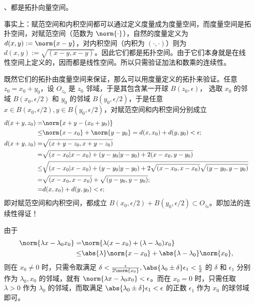 \begin{example}{}
、都是拓扑向量空间。

事实上：赋范空间和内积空间都可以通过定义度量成为度量空间，而度量空间是拓扑空间，对赋范空间（范数为 $\norm{\cdot}$），自然的度量定义为 $d(x,y):=\norm{x-y}$，对内积空间（内积为 $(\cdot,\cdot)$）则为 $d(x,y):=\sqrt{(x-y,x-y)}$。因此它们都是拓扑空间。由于它们本身就是在线性空间上定义的，因而都是线性空间。所以只需验证加法和数乘的连续性。

既然它们的拓扑由度量空间来保证，那么可以用度量定义的拓扑来验证。任意 $z_0=x_0+y_0$，设 $O_{z_0}$ 是 $z_0$ 邻域，于是其包含某一开球  $B(z_0,\epsilon)$， 选取 $x_0$ 的邻域 $B(x_0,\epsilon/2)$ 和 $y_0$ 的邻域 $B(y_0,\epsilon/2)$，于是任意 $x\in B(x_0,\epsilon/2),y\in B(y_0,\epsilon/2)$，对赋范空间和内积空间分别成立 
\begin{equation}
\begin{aligned}
d(x+y,z_0)=&\norm{x+y-(x_0+y_0)}\\
\leq& \norm{x-x_0}+\norm{y-y_0}=d(x,x_0)+d(y,y_0)< \epsilon;\\
d(x+y,z_0)=&\sqrt{(x+y-z_0,x+y-z_0)}\\
=&\sqrt{(x-x_0|x-x_0)+(y-y_0|y-y_0)+2(x-x_0,y-y_0)}\\
\leq&\sqrt{(x-x_0|x-x_0)+(y-y_0|y-y_0)+2\sqrt{(x-x_0,x-x_0)}\sqrt{(y-y_0,y-y_0)}}\\
=& \sqrt{(x-x_0,x-x_0)}+\sqrt{(y-y_0,y-y_0)};\\
=&d(x,x_0)+d(y,y_0)< \epsilon;\\
\end{aligned}~
\end{equation}
即对赋范空间和内积空间，都成立 $B(x_0,\epsilon/2)+B(y_0,\epsilon/2)\subset O_{z_0}$。即加法的连续性得证！

由于
\begin{equation}
\begin{aligned}
\norm{\lambda x-\lambda_0x_0}=&\norm{\lambda(x-x_0)+(\lambda-\lambda_0)x_0}\\
\leq&\abs{\lambda}\norm{x-x_0}+\abs{\lambda-\lambda_0}\norm{x_0},\\
\end{aligned}~
\end{equation}
则在 $x_0\neq0$ 时，只需令取满足 $\delta<\frac{\epsilon}{2\norm{x_0}},\abs{\lambda_0\pm \delta}\epsilon_1<\frac{\epsilon}{2}$ 的 $\delta$ 和 $\epsilon_1$ 分别作为 $\lambda_0,x_0$ 的邻域，就有 $\norm{\lambda x-\lambda_0x_0}<\epsilon$。而在 $x_0=0$ 时，只需任取 $\lambda>0$ 作为 $\lambda_0$ 的邻域，而取满足 $\abs{\lambda_0\pm\delta}\epsilon_1<\epsilon$ 的正数 $\epsilon_1$ 作为 $x_0$ 的球邻域即可。
\end{example}

